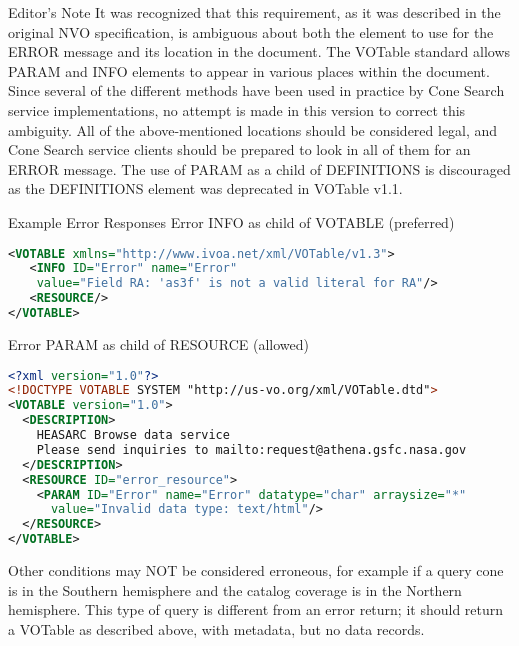\documentclass[11pt,a4paper]{ivoa}
\begin{document}
		\begin{bigdescription}
			\item[Editor's Note]
				It was recognized that this
				requirement, as it was described in the original NVO specification, is
				ambiguous about both the element to use for the ERROR message and its
				location in the document. The VOTable standard allows PARAM and INFO
				elements to appear in various places within the document. Since several
				of the different methods have been used in practice by Cone Search
				service implementations, no attempt is made in this version to correct
				this ambiguity. All of the above-mentioned locations should be
				considered legal, and Cone Search service clients should be prepared to
				look in all of them for an ERROR message. The use of PARAM as a child of
				DEFINITIONS is discouraged as the DEFINITIONS element was deprecated in
				VOTable v1.1.
		\end{bigdescription}
		\begin{bigdescription}
			\item[Example Error Responses]
				Error INFO as child of VOTABLE (preferred)\\
				
			\begin{lstlisting}[language=XML,basicstyle=\footnotesize]			
<VOTABLE xmlns="http://www.ivoa.net/xml/VOTable/v1.3">
   <INFO ID="Error" name="Error" 
    value="Field RA: 'as3f' is not a valid literal for RA"/>
   <RESOURCE/>
</VOTABLE> 
			\end{lstlisting}
			
			Error PARAM as child of RESOURCE (allowed)
			
			\begin{lstlisting}[language=XML,basicstyle=\footnotesize]
<?xml version="1.0"?>
<!DOCTYPE VOTABLE SYSTEM "http://us-vo.org/xml/VOTable.dtd">
<VOTABLE version="1.0">
  <DESCRIPTION>
    HEASARC Browse data service
    Please send inquiries to mailto:request@athena.gsfc.nasa.gov
  </DESCRIPTION>
  <RESOURCE ID="error_resource">
    <PARAM ID="Error" name="Error" datatype="char" arraysize="*"
      value="Invalid data type: text/html"/>
  </RESOURCE>
</VOTABLE>
			\end{lstlisting}
		
		\end{bigdescription}
		
		Other conditions may
		NOT be considered erroneous, for example if a query cone is in the
		Southern hemisphere and the catalog coverage is in the Northern
		hemisphere. This type of query is different from an error return; it
		should return a VOTable as described above, with metadata, but no data
		records.
\end{document}
